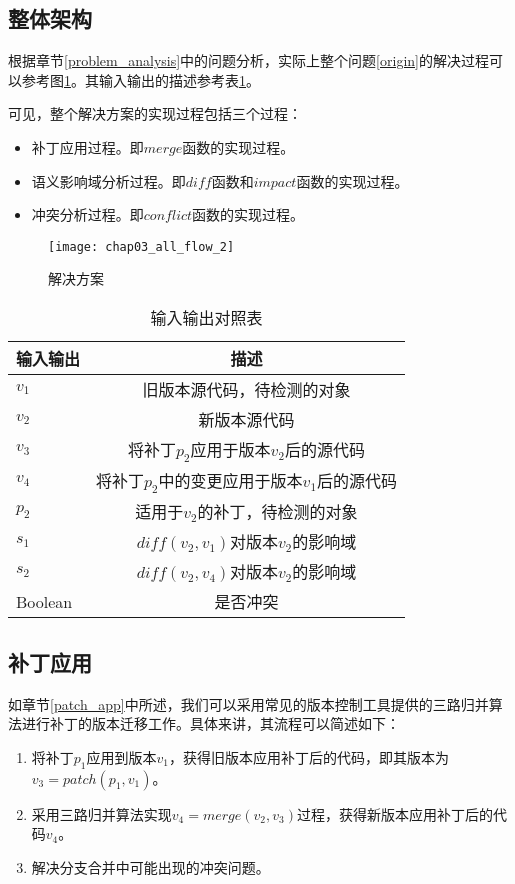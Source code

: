 \subsection{整体架构}
\label {problem_all}

根据章节\ref {problem_analysis}中的问题分析，实际上整个问题\ref {origin}的解决过程可以参考图\ref {all_flow}。其输入输出的描述参考表\ref {all_io}。

可见，整个解决方案的实现过程包括三个过程：
\begin{itemize}
	\item 补丁应用过程。即$merge$函数的实现过程。
	\item 语义影响域分析过程。即$diff$函数和$impact$函数的实现过程。
	\item 冲突分析过程。即$conflict$函数的实现过程。
\end{itemize}

\begin{figure}[H]
	\centering
	\texttt{[image: chap03\_all\_flow\_2]}
	\caption {解决方案}
	\label {all_flow}	
\end{figure}

\begin{table}[H]
	\caption{输入输出对照表}
	\label{all_io}
	\centering
	\begin{tabular}{lc}
		\toprule[1.5pt]
		{\heiti 输入输出} & {\heiti 描述}\\\midrule[1pt]
		$v_1$ & 旧版本源代码，待检测的对象 \\
		$v_2$ & 新版本源代码 \\
		$v_3$ & 将补丁$p_2$应用于版本$v_2$后的源代码 \\
		$v_4$ & 将补丁$p_2$中的变更应用于版本$v_1$后的源代码 \\
		$p_2$ & 适用于$v_2$的补丁，待检测的对象 \\
		$s_1$ & $diff(v_2,v_1)$对版本$v_2$的影响域 \\
		$s_2$ & $diff(v_2,v_4)$对版本$v_2$的影响域 \\
		Boolean & 是否冲突 \\
		\bottomrule[1.5pt]
	\end{tabular}
\end{table}

\subsection{补丁应用}

如章节\ref {patch_app}中所述，我们可以采用常见的版本控制工具提供的三路归并算法进行补丁的版本迁移工作。具体来讲，其流程可以简述如下：
\begin{enumerate}
	\item 将补丁$p_1$应用到版本$v_1$，获得旧版本应用补丁后的代码，即其版本为$v_3 = patch(p_1,v_1)$。
	\item 采用三路归并算法实现$v_4 = merge(v_2,v_3)$过程，获得新版本应用补丁后的代码$v_4$。
	\item 解决分支合并中可能出现的冲突问题。
\end{enumerate}

